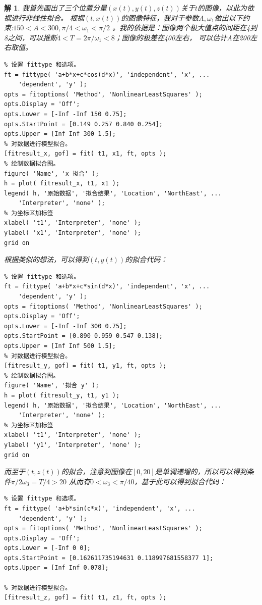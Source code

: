\documentclass[a4paper, 12pt]{ctexart}
\newtheorem*{theorem}{解}
\begin{document}
\begin{theorem}
    我首先画出了三个位置分量$(x(t),y(t),z(t))$关于$t$的图像，以此为依据进行非线性拟合。
    根据$(t,x(t))$的图像特征，我对于参数$A,\omega_1$做出以下约束:$150<A<300,\pi/4 < \omega_1 < \pi/2$
    。我的依据是：图像两个极大值点的间距在4到8之间，可以推断$4<T=2\pi / \omega_1 <8$；图像的极差在400左右，
    可以估计$A$在200左右取值。
    \begin{lstlisting}
% 设置 fittype 和选项。
ft = fittype( 'a+b*x+c*cos(d*x)', 'independent', 'x', ...
    'dependent', 'y' );
opts = fitoptions( 'Method', 'NonlinearLeastSquares' );
opts.Display = 'Off';
opts.Lower = [-Inf -Inf 150 0.75];
opts.StartPoint = [0.149 0.257 0.840 0.254];
opts.Upper = [Inf Inf 300 1.5];
% 对数据进行模型拟合。
[fitresult_x, gof] = fit( t1, x1, ft, opts );
% 绘制数据拟合图。
figure( 'Name', 'x 拟合' );
h = plot( fitresult_x, t1, x1 );
legend( h, '原始数据', '拟合结果', 'Location', 'NorthEast', ...
    'Interpreter', 'none' );
% 为坐标区加标签
xlabel( 't1', 'Interpreter', 'none' );
ylabel( 'x1', 'Interpreter', 'none' );
grid on
    \end{lstlisting}
    根据类似的想法，可以得到$(t,y(t))$的拟合代码：
    \begin{lstlisting}
% 设置 fittype 和选项。
ft = fittype( 'a+b*x+c*sin(d*x)', 'independent', 'x', ...
    'dependent', 'y' );
opts = fitoptions( 'Method', 'NonlinearLeastSquares' );
opts.Display = 'Off';
opts.Lower = [-Inf -Inf 300 0.75];
opts.StartPoint = [0.890 0.959 0.547 0.138];
opts.Upper = [Inf Inf 500 1.5];
% 对数据进行模型拟合。
[fitresult_y, gof] = fit( t1, y1, ft, opts );
% 绘制数据拟合图。
figure( 'Name', '拟合 y' );
h = plot( fitresult_y, t1, y1 );
legend( h, '原始数据', '拟合结果', 'Location', 'NorthEast', ...
    'Interpreter', 'none' );
% 为坐标区加标签
xlabel( 't1', 'Interpreter', 'none' );
ylabel( 'y1', 'Interpreter', 'none' );
grid on
    \end{lstlisting}
    而至于$(t,z(t))$的拟合，注意到图像在$[0,20]$是单调递增的，所以可以得到条件$\pi/2\omega_3=T/4 > 20$
    从而有$0< \omega_3 < \pi/40$，基于此可以得到拟合代码：
    \begin{lstlisting}
% 设置 fittype 和选项。
ft = fittype( 'a+b*sin(c*x)', 'independent', 'x', ...
    'dependent', 'y' );
opts = fitoptions( 'Method', 'NonlinearLeastSquares' );
opts.Display = 'Off';
opts.Lower = [-Inf 0 0];
opts.StartPoint = [0.162611735194631 0.118997681558377 1];
opts.Upper = [Inf Inf 0.078];

% 对数据进行模型拟合。
[fitresult_z, gof] = fit( t1, z1, ft, opts );


\end{lstlisting}
\end{theorem}
\end{document}

